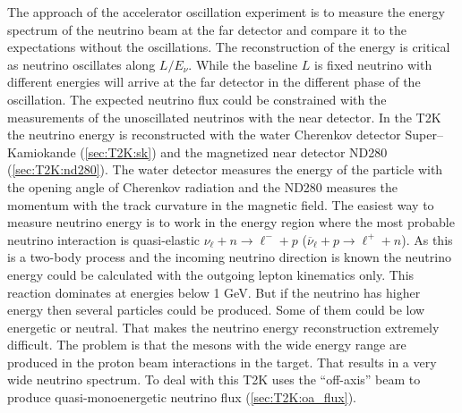 \documentclass[../main.tex]{subfiles}
\begin{document}
The approach of the accelerator oscillation experiment is to measure the energy spectrum of the neutrino beam at the far detector and compare it to the expectations without the oscillations. The reconstruction of the energy is critical as neutrino oscillates along $L/E_\nu$. While the baseline $L$ is fixed neutrino with different energies will arrive at the far detector in the different phase of the oscillation. The expected neutrino flux could be constrained with the measurements of the unoscillated neutrinos with the near detector. In the T2K the neutrino energy is reconstructed with the water Cherenkov detector Super--Kamiokande (\autoref{sec:T2K:sk}) and the magnetized near detector ND280 (\autoref{sec:T2K:nd280}). The water detector measures the energy of the particle with the opening angle of Cherenkov radiation and the ND280 measures the momentum with the track curvature in the magnetic field. The easiest way to measure neutrino energy is to work in the energy region where the most probable neutrino interaction is quasi-elastic $\nu_\ell+n\to\ell^-+p$ ($\overline{\nu}_\ell+p\to\ell^++n$). As this is a two-body process and the incoming neutrino direction is known the neutrino energy could be calculated with the outgoing lepton kinematics only. This reaction dominates at energies below 1 GeV. But if the neutrino has higher energy then several particles could be produced. Some of them could be low energetic or neutral. That makes the neutrino energy reconstruction extremely difficult. The problem is that the mesons with the wide energy range are produced in the proton beam interactions in the target. That results in a very wide neutrino spectrum. To deal with this T2K uses the ``off-axis'' beam to produce quasi-monoenergetic neutrino flux (\autoref{sec:T2K:oa_flux}).
\end{document}
